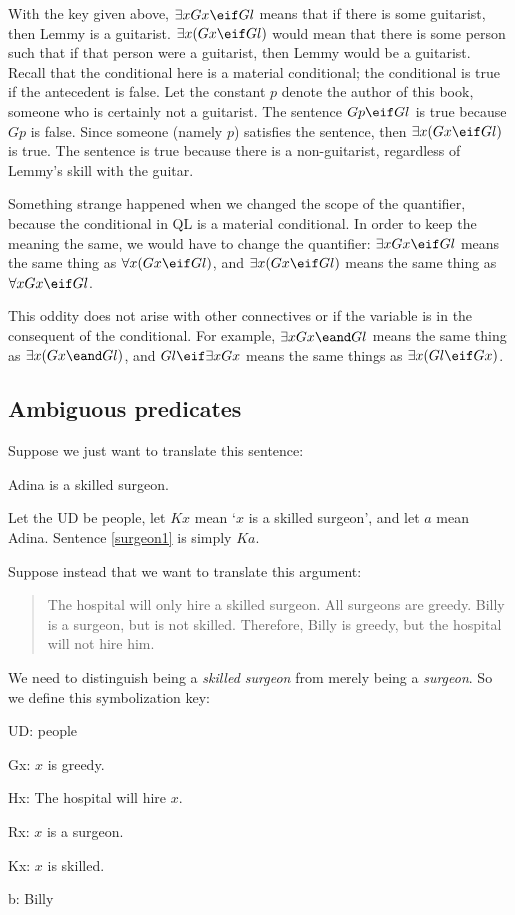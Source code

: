 With the key given above, $\exists x Gx \eif Gl$ means that if there is some guitarist, then Lemmy is a guitarist. $\exists x (Gx \eif Gl)$ would mean that there is some person such that if that person were a guitarist, then Lemmy would be a guitarist. Recall that the conditional here is a material conditional; the conditional is true if the antecedent is false. Let the constant $p$ denote the author of this book, someone who is certainly not a guitarist. The sentence $Gp \eif Gl$ is true because $Gp$ is false. Since someone (namely $p$) satisfies the sentence, then $\exists x (Gx \eif Gl)$ is true. The sentence is true because there is a non-guitarist, regardless of Lemmy's skill with the guitar.


Something strange happened when we changed the scope of the quantifier, because the conditional in QL is a material conditional. In order to keep the meaning the same, we would have to change the quantifier: $\exists x Gx \eif Gl$ means the same thing as $\forall x (Gx \eif Gl)$, and $\exists x (Gx \eif Gl)$ means the same thing as $\forall x Gx \eif Gl$.

This oddity does not arise with other connectives or if the variable is in the consequent of the conditional. For example, $\exists x Gx \eand Gl$ means the same thing as $\exists x (Gx \eand Gl)$, and $Gl \eif \exists x Gx$ means the same things as $\exists x(Gl \eif Gx)$.


\subsection{Ambiguous predicates}

Suppose we just want to translate this sentence:
\begin{earg}
\item[\ex{surgeon1}] Adina is a skilled surgeon.
\end{earg}
Let the UD be people, let $Kx$ mean `$x$ is a skilled surgeon', and let $a$ mean Adina. Sentence \ref{surgeon1} is simply $Ka$.


Suppose instead that we want to translate this argument:
\begin{quote}
The hospital will only hire a skilled surgeon. All surgeons are greedy. Billy is a surgeon, but is not skilled. Therefore, Billy is greedy, but the hospital will not hire him.
\end{quote}
We need to distinguish being a \emph{skilled surgeon} from merely being a \emph{surgeon}. So we define this symbolization key:
\begin{ekey}
\item[UD:] people
\item[Gx:] $x$ is greedy.
\item[Hx:] The hospital will hire $x$.
\item[Rx:] $x$ is a surgeon.
\item[Kx:] $x$ is skilled.
\item[b:] Billy
\end{ekey}

